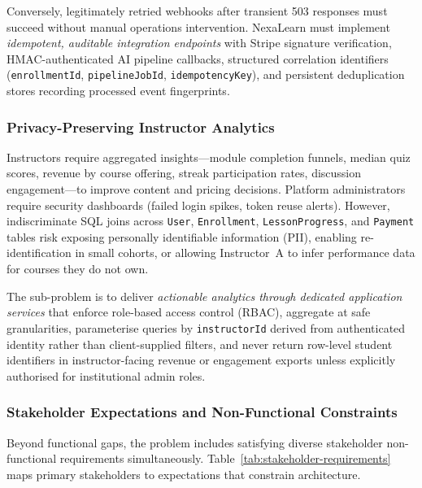 Conversely, legitimately retried webhooks after transient 503 responses must succeed without manual operations intervention. NexaLearn must implement \textit{idempotent, auditable integration endpoints} with Stripe signature verification, HMAC-authenticated AI pipeline callbacks, structured correlation identifiers (\texttt{enrollmentId}, \texttt{pipelineJobId}, \texttt{idempotencyKey}), and persistent deduplication stores recording processed event fingerprints.

\subsubsection{Privacy-Preserving Instructor Analytics}
\label{subsubsec:privacy-analytics}

Instructors require aggregated insights---module completion funnels, median quiz scores, revenue by course offering, streak participation rates, discussion engagement---to improve content and pricing decisions. Platform administrators require security dashboards (failed login spikes, token reuse alerts). However, indiscriminate SQL joins across \texttt{User}, \texttt{Enrollment}, \texttt{LessonProgress}, and \texttt{Payment} tables risk exposing personally identifiable information (PII), enabling re-identification in small cohorts, or allowing Instructor~A to infer performance data for courses they do not own.

The sub-problem is to deliver \textit{actionable analytics through dedicated application services} that enforce role-based access control (RBAC), aggregate at safe granularities, parameterise queries by \texttt{instructorId} derived from authenticated identity rather than client-supplied filters, and never return row-level student identifiers in instructor-facing revenue or engagement exports unless explicitly authorised for institutional admin roles.

\subsubsection{Stakeholder Expectations and Non-Functional Constraints}
\label{subsubsec:stakeholder-nfr}

Beyond functional gaps, the problem includes satisfying diverse stakeholder non-functional requirements simultaneously. Table~\ref{tab:stakeholder-requirements} maps primary stakeholders to expectations that constrain architecture.

